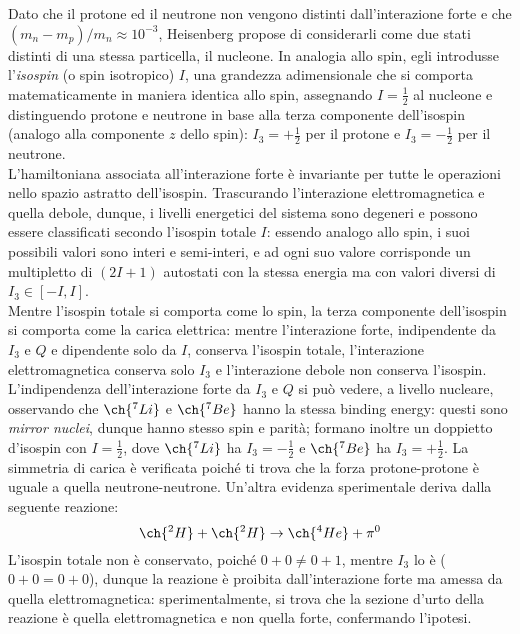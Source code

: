Dato che il protone ed il neutrone non vengono distinti dall'interazione forte e che $ \left( m_n - m_p \right) / m_n \approx 10^{-3} $, Heisenberg propose di considerarli come due stati distinti di una stessa particella, il nucleone. In analogia allo spin, egli introdusse l'\textit{isospin} (o spin isotropico) $ I $, una grandezza adimensionale che si comporta matematicamente in maniera identica allo spin, assegnando $ I = \frac{1}{2} $ al nucleone e distinguendo protone e neutrone in base alla terza componente dell'isospin (analogo alla componente $ z $ dello spin): $ I_3 = +\frac{1}{2} $ per il protone e $ I_3 = -\frac{1}{2} $ per il neutrone.\\
L'hamiltoniana associata all'interazione forte è invariante per tutte le operazioni nello spazio astratto dell'isospin. Trascurando l'interazione elettromagnetica e quella debole, dunque, i livelli energetici del sistema sono degeneri e possono essere classificati secondo l'isospin totale $ I $: essendo analogo allo spin, i suoi possibili valori sono interi e semi-interi, e ad ogni suo valore corrisponde un multipletto di $ (2I + 1) $ autostati con la stessa energia ma con valori diversi di $ I_3 \in \left[ -I, I \right] $.\\
Mentre l'isospin totale si comporta come lo spin, la terza componente dell'isospin si comporta come la carica elettrica: mentre l'interazione forte, indipendente da $ I_3 $ e $ Q $ e dipendente solo da $ I $, conserva l'isospin totale, l'interazione elettromagnetica conserva solo $ I_3 $ e l'interazione debole non conserva l'isospin. L'indipendenza dell'interazione forte da $ I_3 $ e $ Q $ si può vedere, a livello nucleare, osservando che $ \ch{^7Li} $ e $ \ch{^7Be} $ hanno la stessa binding energy: questi sono \textit{mirror nuclei}, dunque hanno stesso spin e parità; formano inoltre un doppietto d'isospin con $ I = \frac{1}{2} $, dove $ \ch{^7Li} $ ha $ I_3 = -\frac{1}{2} $ e $ \ch{^7Be} $ ha $ I_3 = +\frac{1}{2} $. La simmetria di carica è verificata poiché ti trova che la forza protone-protone è uguale a quella neutrone-neutrone. Un'altra evidenza sperimentale deriva dalla seguente reazione:
\begin{equation*}
	\ch{^2H} + \ch{^2H} \rightarrow \ch{^4He} + \pi^0
\end{equation*}
L'isospin totale non è conservato, poiché $ 0 + 0 \neq 0 + 1 $, mentre $ I_3 $ lo è ($ 0 + 0 = 0 + 0 $), dunque la reazione è proibita dall'interazione forte ma amessa da quella elettromagnetica: sperimentalmente, si trova che la sezione d'urto della reazione è quella elettromagnetica e non quella forte, confermando l'ipotesi.\\
